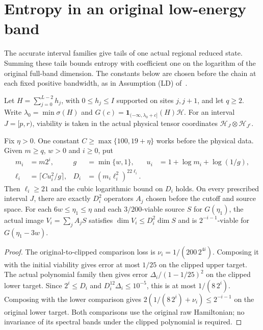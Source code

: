 \section{Entropy in an original low-energy band}

The accurate interval families give tails of one actual regional reduced
state. Summing these tails bounds entropy with coefficient one on the
logarithm of the original full-band dimension. The constants below are
chosen before the chain at each fixed positive bandwidth, as in
Assumption (LD) of~\cite{Arad2016RigorousRG}.

Let $H=\sum_{j=0}^{L-2}h_j$, with $0\le h_j\le I$ supported on
sites $j,j+1$, and let $q\ge2$. Write $\lambda_0=\min\sigma(H)$ and
$G(c)=\mathbf1_{(-\infty,\lambda_0+c]}(H)\mathcal H$. For an interval
$J=[p,r)$, viability is taken in the actual physical tensor coordinates
$\mathcal H_J\otimes\mathcal H_{J^c}$.

\begin{lemma}
    \label{lem:ld_original_dyadic_refinement}
    \leanok
    Fix $\eta>0$. One constant $C\ge\max\{100,19+\eta\}$ works
    before the physical data. Given $m\ge q$, $w>0$ and $i\ge0$, put
    \begin{align*}
        m_i    & =m2^i,                  & g   & =\min\{w,1\},              &
        u_i    & =1+\log m_i+\log(1/g),                                       \\
        \ell_i & =\lceil Cu_i^2/g\rceil, & D_i & =(m_i\ell_i^2)^{22\ell_i}.
    \end{align*}
    Then $\ell_i\ge21$ and the cubic logarithmic bound on $D_i$ holds.
    On every prescribed interval $J$, there are exactly $D_i^2$ operators
    $A_j$ chosen before the cutoff and source space. For each
    $6w\le\eta_1\le\eta$ and each $3/200$-viable source $S$ for
    $G(\eta_1)$, the actual image $V_i=\sum_j A_jS$ satisfies
    $\dim V_i\le D_i^2\dim S$ and is $2^{-i-1}$-viable for
    $G(\eta_1-3w)$.
\end{lemma}
\begin{proof}\leanok
    The original-to-clipped comparison loss is
    $\nu_i=1/(200\,2^{4i})$. Composing it with the initial viability
    gives error at most $1/25$ on the clipped upper target. The actual
    polynomial family then gives error $\Delta_i/(1-1/25)^2$ on the
    clipped lower target. Since $2^i\le D_i$ and
    $D_i^{12}\Delta_i\le10^{-5}$, this is at most $1/(8\,2^i)$.
    Composing with the lower comparison gives
    $2(1/(8\,2^i)+\nu_i)\le2^{-i-1}$ on the original lower target.
    Both comparisons use the original raw Hamiltonian; no invariance of
    its spectral bands under the clipped polynomial is required.
\end{proof}

